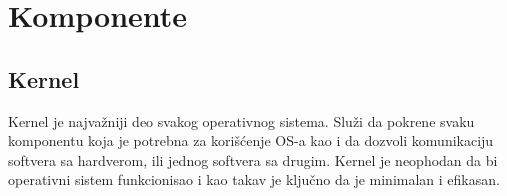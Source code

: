 \documentclass[a4paper,14pt]{article}
\begin{document}
\begin{figure}[h]
	\centering
\end{figure}
\newpage

\section{Komponente}
\subsection{Kernel}
Kernel\cite{kernel} je najvažniji deo svakog operativnog sistema. Služi da pokrene svaku komponentu koja je potrebna za korišćenje OS-a kao i da dozvoli komunikaciju softvera sa hardverom, ili jednog softvera sa drugim. Kernel je neophodan da bi operativni sistem funkcionisao i kao takav je ključno da je minimalan i efikasan.
\end{document}
